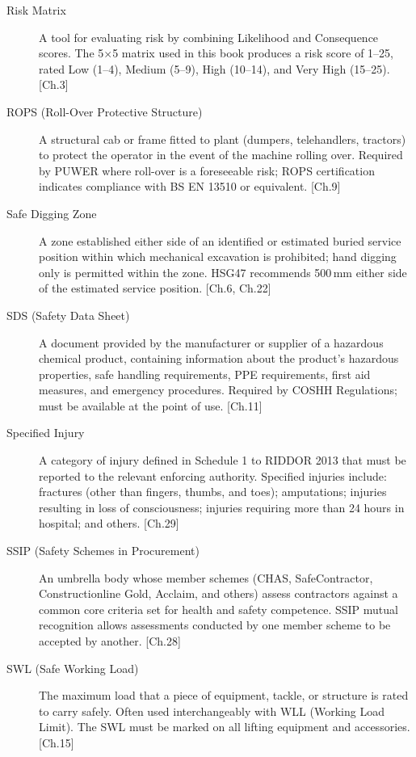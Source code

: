 \begin{description}
\item[Risk Matrix] A tool for evaluating risk by combining Likelihood and Consequence scores. The 5$\times$5 matrix used in this book produces a risk score of 1--25, rated Low (1--4), Medium (5--9), High (10--14), and Very High (15--25). [Ch.3]

\item[ROPS (Roll-Over Protective Structure)] A structural cab or frame fitted to plant (dumpers, telehandlers, tractors) to protect the operator in the event of the machine rolling over. Required by PUWER where roll-over is a foreseeable risk; ROPS certification indicates compliance with BS EN 13510 or equivalent. [Ch.9]

\item[Safe Digging Zone] A zone established either side of an identified or estimated buried service position within which mechanical excavation is prohibited; hand digging only is permitted within the zone. HSG47 recommends 500\,mm either side of the estimated service position. [Ch.6, Ch.22]

\item[SDS (Safety Data Sheet)] A document provided by the manufacturer or supplier of a hazardous chemical product, containing information about the product's hazardous properties, safe handling requirements, PPE requirements, first aid measures, and emergency procedures. Required by COSHH Regulations; must be available at the point of use. [Ch.11]

\item[Specified Injury] A category of injury defined in Schedule 1 to RIDDOR 2013 that must be reported to the relevant enforcing authority. Specified injuries include: fractures (other than fingers, thumbs, and toes); amputations; injuries resulting in loss of consciousness; injuries requiring more than 24 hours in hospital; and others. [Ch.29]

\item[SSIP (Safety Schemes in Procurement)] An umbrella body whose member schemes (CHAS, SafeContractor, Constructionline Gold, Acclaim, and others) assess contractors against a common core criteria set for health and safety competence. SSIP mutual recognition allows assessments conducted by one member scheme to be accepted by another. [Ch.28]

\item[SWL (Safe Working Load)] The maximum load that a piece of equipment, tackle, or structure is rated to carry safely. Often used interchangeably with WLL (Working Load Limit). The SWL must be marked on all lifting equipment and accessories. [Ch.15]


\end{description}
